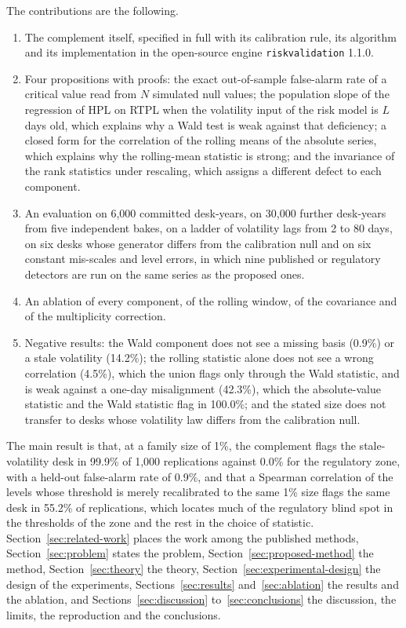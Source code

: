 The contributions are the following.
\begin{enumerate}
\item The complement itself, specified in full with its calibration rule, its algorithm and its implementation in the open-source engine \texttt{riskvalidation} 1.1.0.
\item Four propositions with proofs: the exact out-of-sample false-alarm rate of a critical value read from $N$ simulated null values; the population slope of the regression of HPL on RTPL when the volatility input of the risk model is $L$ days old, which explains why a Wald test is weak against that deficiency; a closed form for the correlation of the rolling means of the absolute series, which explains why the rolling-mean statistic is strong; and the invariance of the rank statistics under rescaling, which assigns a different defect to each component.
\item An evaluation on 6,000 committed desk-years, on 30,000 further desk-years from five independent bakes, on a ladder of volatility lags from 2 to 80 days, on six desks whose generator differs from the calibration null and on six constant mis-scales and level errors, in which nine published or regulatory detectors are run on the same series as the proposed ones.
\item An ablation of every component, of the rolling window, of the covariance and of the multiplicity correction.
\item Negative results: the Wald component does not see a missing basis (0.9\%) or a stale volatility (14.2\%); the rolling statistic alone does not see a wrong correlation (4.5\%), which the union flags only through the Wald statistic, and is weak against a one-day misalignment (42.3\%), which the absolute-value statistic and the Wald statistic flag in 100.0\%; and the stated size does not transfer to desks whose volatility law differs from the calibration null.
\end{enumerate}

The main result is that, at a family size of 1\%, the complement flags the stale-volatility desk in 99.9\% of 1,000 replications against 0.0\% for the regulatory zone, with a held-out false-alarm rate of 0.9\%, and that a Spearman correlation of the levels whose threshold is merely recalibrated to the same 1\% size flags the same desk in 55.2\% of replications, which locates much of the regulatory blind spot in the thresholds of the zone and the rest in the choice of statistic.
Section~\ref{sec:related-work} places the work among the published methods, Section~\ref{sec:problem} states the problem, Section~\ref{sec:proposed-method} the method, Section~\ref{sec:theory} the theory, Section~\ref{sec:experimental-design} the design of the experiments, Sections~\ref{sec:results} and~\ref{sec:ablation} the results and the ablation, and Sections~\ref{sec:discussion} to~\ref{sec:conclusions} the discussion, the limits, the reproduction and the conclusions.
